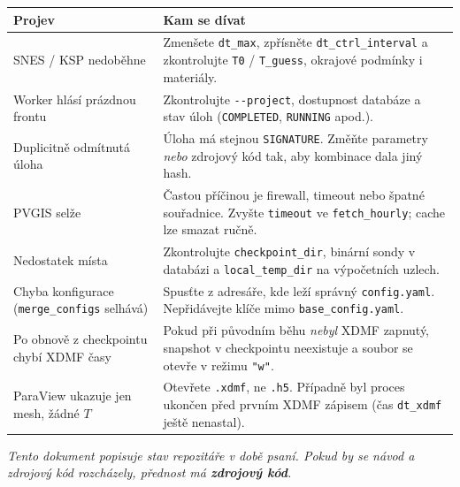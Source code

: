 \documentclass[a4paper,11pt]{article}
\begin{document}
\begin{longtable}{@{}L{5.5cm} L{9.5cm}@{}}
\toprule
\textbf{Projev} & \textbf{Kam se dívat} \\
\midrule
\endhead
SNES / KSP nedoběhne
  & Zmenšete \texttt{dt\_max}, zpřísněte \texttt{dt\_ctrl\_interval}
    a zkontrolujte \texttt{T0} / \texttt{T\_guess}, okrajové podmínky
    i materiály. \\
Worker hlásí prázdnou frontu
  & Zkontrolujte \texttt{-{}-project}, dostupnost databáze a stav úloh
    (\texttt{COMPLETED}, \texttt{RUNNING} apod.). \\
Duplicitně odmítnutá úloha
  & Úloha má stejnou \texttt{SIGNATURE}. Změňte parametry \emph{nebo} zdrojový
    kód tak, aby kombinace dala jiný hash. \\
PVGIS selže
  & Častou příčinou je firewall, timeout nebo špatné souřadnice. Zvyšte
    \texttt{timeout} ve \texttt{fetch\_hourly}; cache lze smazat ručně. \\
Nedostatek místa
  & Zkontrolujte \texttt{checkpoint\_dir}, binární sondy v databázi
    a \texttt{local\_temp\_dir} na výpočetních uzlech. \\
Chyba konfigurace (\texttt{merge\_configs} selhává)
  & Spusťte z adresáře, kde leží správný \texttt{config.yaml}. Nepřidávejte
    klíče mimo \texttt{base\_config.yaml}. \\
Po obnově z checkpointu chybí XDMF časy
  & Pokud při původním běhu \emph{nebyl} XDMF zapnutý, snapshot v checkpointu
    neexistuje a soubor se otevře v režimu \texttt{"w"}. \\
ParaView ukazuje jen mesh, žádné \(T\)
  & Otevřete \texttt{.xdmf}, ne \texttt{.h5}. Případně byl proces ukončen před
    prvním XDMF zápisem (čas \texttt{dt\_xdmf} ještě nenastal). \\
\bottomrule
\end{longtable}

\bigskip
\noindent
\emph{Tento dokument popisuje stav repozitáře v době psaní. Pokud by se návod
a zdrojový kód rozcházely, přednost má \textbf{zdrojový kód}.}
\end{document}
